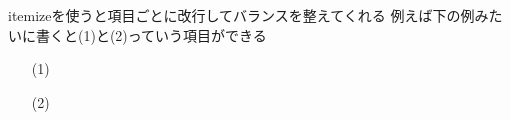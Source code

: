 \begin{itemize}
    \item[]
    \item[] 
\end{itemize}

itemizeを使うと項目ごとに改行してバランスを整えてくれる
例えば下の例みたいに書くと(1)と(2)っていう項目ができる

\begin{itemize}
    \item[(1)]
    \item[(2)] 
\end{itemize}